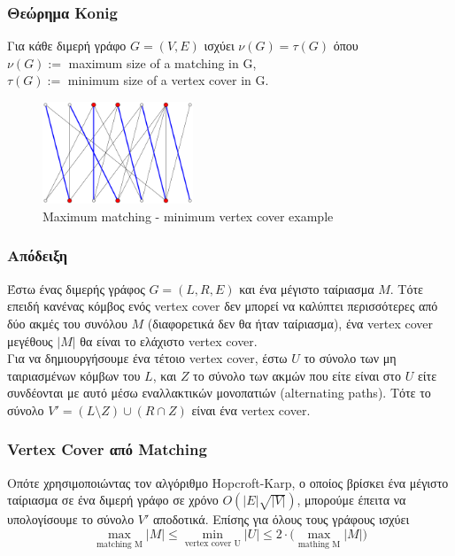 \documentclass[greek]{beamer}
\begin{document}

\begin{frame}
\frametitle{Θεώρημα Konig}
Για κάθε διμερή γράφο $G=(V,E)$ ισχύει $\nu(G) = \tau(G)$ όπου\\
$\nu(G) := $ maximum size of a matching in G,\\
$\tau(G) := $ minimum size of a vertex cover in G.

\begin{figure}[H]
\caption{Maximum matching - minimum vertex cover example}
\centering
\includegraphics[width=0.4\textwidth]{Figures/KonigTheo.png}\centering
\end{figure}
\end{frame}


\begin{frame}
\frametitle{Απόδειξη}
Έστω ένας διμερής γράφος $G = (L, R, E)$ και ένα μέγιστο ταίριασμα $M$. Τότε επειδή κανένας κόμβος ενός vertex cover δεν μπορεί να καλύπτει περισσότερες από δύο ακμές του συνόλου $M$ (διαφορετικά δεν θα ήταν ταίριασμα), ένα vertex cover μεγέθους $|M|$ θα είναι το ελάχιστο vertex cover.\\
Για να δημιουργήσουμε ένα τέτοιο vertex cover, έστω $U$ το σύνολο των μη ταιριασμένων κόμβων του $L$, και $Z$ το σύνολο των ακμών που είτε είναι στο $U$ είτε συνδέονται με αυτό μέσω εναλλακτικών μονοπατιών (alternating paths). Τότε το σύνολο $V' = (L \setminus Z) \cup (R \cap Z)$ είναι ένα vertex cover. 
\end{frame}


\begin{frame}
\frametitle{Vertex Cover από Matching}
Οπότε χρησιμοποιώντας τον αλγόριθμο Hopcroft-Karp, ο οποίος βρίσκει ένα μέγιστο ταίριασμα σε ένα διμερή γράφο σε χρόνο $O(|E| \sqrt{|V|})$, μπορούμε έπειτα να υπολογίσουμε το σύνολο $V'$ αποδοτικά.
Επίσης για όλους τους γράφους ισχύει 
$$ \max_{\text{matching M}} |M| \leq  \min_{\text{vertex cover U}} |U| \leq 2 \cdot \Big( \max_{\text{mathing M}} |M|\Big)$$
\end{frame}
\end{document}
